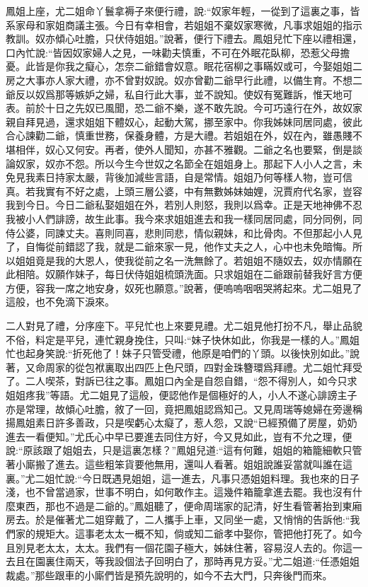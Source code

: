 \begin{parag}
    鳳姐上座，尤二姐命丫鬟拿褥子來便行禮，說:“奴家年輕，一從到了這裏之事，皆系家母和家姐商議主張。今日有幸相會，若姐姐不棄奴家寒微，凡事求姐姐的指示教訓。奴亦傾心吐膽，只伏侍姐姐。”說著，便行下禮去。鳳姐兒忙下座以禮相還，口內忙說:“皆因奴家婦人之見，一味勸夫慎重，不可在外眠花臥柳，恐惹父母擔憂。此皆是你我之癡心，怎奈二爺錯會奴意。眠花宿柳之事瞞奴或可，今娶姐姐二房之大事亦人家大禮，亦不曾對奴說。奴亦曾勸二爺早行此禮，以備生育。不想二爺反以奴爲那等嫉妒之婦，私自行此大事，並不說知。使奴有冤難訴，惟天地可表。前於十日之先奴已風聞，恐二爺不樂，遂不敢先說。今可巧遠行在外，故奴家親自拜見過，還求姐姐下體奴心，起動大駕，挪至家中。你我姊妹同居同處，彼此合心諫勸二爺，慎重世務，保養身體，方是大禮。若姐姐在外，奴在內，雖愚賤不堪相伴，奴心又何安。再者，使外人聞知，亦甚不雅觀。二爺之名也要緊，倒是談論奴家，奴亦不怨。所以今生今世奴之名節全在姐姐身上。那起下人小人之言，未免見我素日持家太嚴，背後加減些言語，自是常情。姐姐乃何等樣人物，豈可信真。若我實有不好之處，上頭三層公婆，中有無數姊妹妯娌，況賈府代名家，豈容我到今日。今日二爺私娶姐姐在外，若別人則怒，我則以爲幸。正是天地神佛不忍我被小人們誹謗，故生此事。我今來求姐姐進去和我一樣同居同處，同分同例，同侍公婆，同諫丈夫。喜則同喜，悲則同悲，情似親妹，和比骨肉。不但那起小人見了，自悔從前錯認了我，就是二爺來家一見，他作丈夫之人，心中也未免暗悔。所以姐姐竟是我的大恩人，使我從前之名一洗無餘了。若姐姐不隨奴去，奴亦情願在此相陪。奴願作妹子，每日伏侍姐姐梳頭洗面。只求姐姐在二爺跟前替我好言方便方便，容我一席之地安身，奴死也願意。”說著，便嗚嗚咽咽哭將起來。尤二姐見了這般，也不免滴下淚來。
\end{parag}


\begin{parag}
    二人對見了禮，分序座下。平兒忙也上來要見禮。尤二姐見他打扮不凡，舉止品貌不俗，料定是平兒，連忙親身挽住，只叫:“妹子快休如此，你我是一樣的人。”鳳姐忙也起身笑說:“折死他了！妹子只管受禮，他原是咱們的丫頭。以後快別如此。”說著，又命周家的從包袱裏取出四匹上色尺頭，四對金珠簪環爲拜禮。尤二姐忙拜受了。二人喫茶，對訴已往之事。鳳姐口內全是自怨自錯，“怨不得別人，如今只求姐姐疼我”等語。尤二姐見了這般，便認他作是個極好的人，小人不遂心誹謗主子亦是常理，故傾心吐膽，敘了一回，竟把鳳姐認爲知己。又見周瑞等媳婦在旁邊稱揚鳳姐素日許多善政，只是喫虧心太癡了，惹人怨，又說“已經預備了房屋，奶奶進去一看便知。”尤氏心中早已要進去同住方好，今又見如此，豈有不允之理，便說:“原該跟了姐姐去，只是這裏怎樣？”鳳姐兒道:“這有何難，姐姐的箱籠細軟只管著小廝搬了進去。這些粗笨貨要他無用，還叫人看著。姐姐說誰妥當就叫誰在這裏。”尤二姐忙說:“今日既遇見姐姐，這一進去，凡事只憑姐姐料理。我也來的日子淺，也不曾當過家，世事不明白，如何敢作主。這幾件箱籠拿進去罷。我也沒有什麼東西，那也不過是二爺的。”鳳姐聽了，便命周瑞家的記清，好生看管著抬到東廂房去。於是催著尤二姐穿戴了，二人攜手上車，又同坐一處，又悄悄的告訴他:“我們家的規矩大。這事老太太一概不知，倘或知二爺孝中娶你，管把他打死了。如今且別見老太太，太太。我們有一個花園子極大，姊妹住著，容易沒人去的。你這一去且在園裏住兩天，等我設個法子回明白了，那時再見方妥。”尤二姐道:“任憑姐姐裁處。”那些跟車的小廝們皆是預先說明的，如今不去大門，只奔後門而來。
\end{parag}


